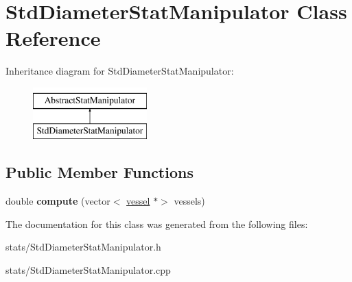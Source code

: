 \hypertarget{class_std_diameter_stat_manipulator}{}\section{Std\+Diameter\+Stat\+Manipulator Class Reference}
\label{class_std_diameter_stat_manipulator}
Inheritance diagram for Std\+Diameter\+Stat\+Manipulator\+:\begin{figure}[H]
\begin{center}
\leavevmode
\includegraphics[height=2.000000cm]{class_std_diameter_stat_manipulator}
\end{center}
\end{figure}
\subsection*{Public Member Functions}
\begin{DoxyCompactItemize}
\item 
\mbox{\label{class_std_diameter_stat_manipulator_ac27e5382f27a75b4d6948f51b96f4705}} 
double {\bfseries compute} (vector$<$ \mbox{\hyperlink{structvessel}{vessel}} $\ast$$>$ vessels)
\end{DoxyCompactItemize}


The documentation for this class was generated from the following files\+:\begin{DoxyCompactItemize}
\item 
stats/Std\+Diameter\+Stat\+Manipulator.\+h\item 
stats/Std\+Diameter\+Stat\+Manipulator.\+cpp\end{DoxyCompactItemize}
